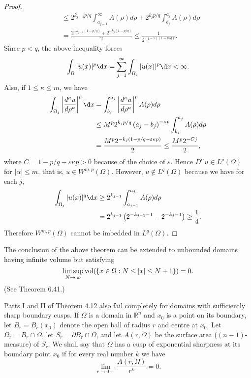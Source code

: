 \begin{proof}
\[\begin{aligned}
  & \leq 2^{k_{j-1} p / q} \int_{a_{j-1}}^{\infty} A(\rho) d \rho+2^{k_j p / q} \int_{b_j}^{a_j} A(\rho) d \rho \\
  & =\frac{2^{-k_{j-1}(1-p / q)}+2^{-k_j(1-p / q)}}{2} \leq \frac{1}{2^{(j-1)(1-p / q)}} .
  \end{aligned}
  \]
  Since $p<q$, the above inequality forces
  \[
  \int_{\Omega}|u(x)|^p \d x=\sum_{j=1}^{\infty} \int_{\Omega_j}|u(x)|^p \d x<\infty .
  \]
  Also, if $1 \leq \kappa \leq m$, we have
  \[
  \begin{aligned}
  \int_{\Omega_j}\left|\frac{d^\kappa u}{d \rho^\kappa}\right|^p \d x & =\int_{b_j}^{a_j}\left|\frac{d^\kappa u}{d \rho^\kappa}\right|^p A(\rho) d \rho \\
  & \leq M^p 2^{k_j p / q}\left(a_j-b_j\right)^{-\kappa p} \int_{b_j}^{a_j} A(\rho) d \rho \\
  & =\frac{M^p 2^{-k_j(1-p / q-\varepsilon \kappa p)}}{2} \leq \frac{M^p 2^{-C j}}{2},
  \end{aligned}
  \]
  where $C=1-p / q-\varepsilon \kappa p>0$ because of the choice of $\varepsilon$.
  Hence $D^\alpha u \in L^p(\Omega)$ for $|\alpha| \leq m$, that is, $u \in W^{m,p}(\Omega)$.
  However, $u \notin L^q(\Omega)$ because we have for each $j$,
  \[
  \begin{aligned}
  \int_{\Omega_j}|u(x)|^q \d x & \geq 2^{k_{j-1}} \int_{a_{j-1}}^{a_j} A(\rho) d \rho \\
  & =2^{k_{j-1}}\left(2^{-k_{j-1}-1}-2^{-k_j-1}\right) \geq \frac{1}{4} .
  \end{aligned}
  \]
  Therefore $W^{m,p}(\Omega)$ cannot be imbedded in $L^q(\Omega)$.
\end{proof}

The conclusion of the above theorem can be extended to unbounded domains having infinite volume but satisfying
\[\limsup_{N \rightarrow \infty} \operatorname{vol}(\{x \in \Omega: N \leq|x| \leq N+1\})=0.\]
(See Theorem 6.41.)

\begin{para}
  Parts I and II of Theorem 4.12 also fail completely for domains with sufficiently sharp boundary cusps. 
  If $\Omega$ is a domain in $\mathbb{R}^n$ and $x_0$ is a point on its boundary,
  let $B_r=B_r\left(x_0\right)$ denote the open ball of radius $r$ and centre at $x_0$.
  Let $\Omega_r=B_r \cap \Omega$, let $S_r = \partial B_r \cap \Omega$,
  and let $A(r, \Omega)$ be the surface area ($(n-1)$-measure) of $S_r$.
  We shall say that $\Omega$ has a cusp of exponential sharpness
  at its boundary point $x_0$ if for every real number $k$ we have
  \begin{equation}\label{eq:4.25}
    \lim_{r\to 0+} \frac{A(r, \Omega)}{r^k} = 0.
  \end{equation}
\end{para}

